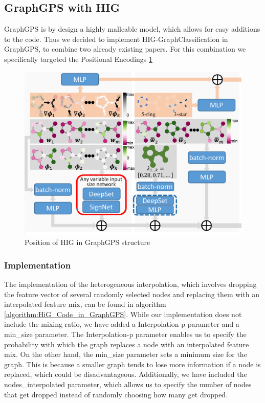 \subsection{GraphGPS with HIG}
GraphGPS is by design a highly malleable model, which allows for easy additions to the code. Thus we decided to implement HIG-GraphClassification in GraphGPS, to combine two already existing papers. For this combination we specifically targeted the Positional Encodings \ref{fig:gps-hig-position}

\begin{figure}[ht]
    \centering
    \includegraphics[scale=0.2]{tex/res/gps_hig_position.png}
    \caption{Position of HIG in GraphGPS structure}
    \label{fig:gps-hig-position}
\end{figure}

\subsubsection{Implementation}

The implementation of the heterogeneous interpolation, which involves dropping the feature vector of several randomly selected nodes and replacing them with an interpolated feature mix, can be found in algorithm \ref{algorithm:HiG_Code_in_GraphGPS}. While our implementation does not include the mixing ratio, we have added a Interpolation-p parameter and a min\_size parameter. The Interpolation-p parameter enables us to specify the probability with which the graph replaces a node with an interpolated feature mix. On the other hand, the min\_size parameter sets a minimum size for the graph. This is because a smaller graph tends to lose more information if a node is replaced, which could be disadvantageous. Additionally, we have included the nodes\_interpolated parameter, which allows us to specify the number of nodes that get dropped instead of randomly choosing how many get dropped.

